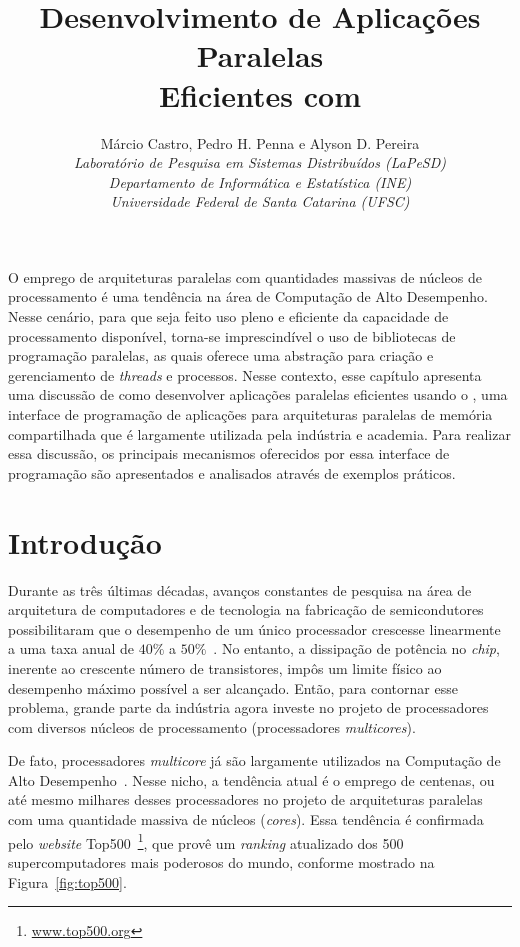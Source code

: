 \documentclass{SBCbookchapter}
\author{%
	Márcio Castro, Pedro H. Penna e Alyson D. Pereira                  \\
	\textit{Laboratório de Pesquisa em Sistemas Distribuídos (LaPeSD)} \\
	\textit{Departamento de Informática e Estatística (INE)}           \\
	\textit{Universidade Federal de Santa Catarina (UFSC)}
}
\title{Desenvolvimento de Aplicações Paralelas\\Eficientes com \openmp}
\begin{document}
\maketitle

\begin{resumo}
	O emprego de arquiteturas paralelas com quantidades massivas de
	núcleos de processamento é uma tendência na área de Computação de
	Alto Desempenho. Nesse cenário, para que seja feito uso pleno e
	eficiente da capacidade de processamento disponível, torna-se
	imprescindível o uso de bibliotecas de programação paralelas, as
	quais oferece uma abstração para criação e gerenciamento de
	\textit{threads} e processos. Nesse contexto, esse capítulo
	apresenta uma discussão de como desenvolver aplicações paralelas
	eficientes usando o \openmp, uma interface de programação de
	aplicações para arquiteturas paralelas de memória compartilhada que
	é largamente utilizada pela indústria e academia. Para realizar essa
	discussão, os principais mecanismos oferecidos por essa interface de
	programação são apresentados e analisados através de exemplos
	práticos.
\end{resumo}

\section{Introdução}

	Durante as três últimas décadas, avanços constantes de pesquisa na
	área de arquitetura de computadores e de tecnologia na fabricação de
	semicondutores possibilitaram que o desempenho de um único
	processador crescesse linearmente a uma taxa anual de $40\%$ a
	$50\%$~\cite{LARUS08}. No entanto, a dissipação de potência no
	\textit{chip}, inerente ao crescente número de transistores, impôs
	um limite físico ao desempenho máximo possível a ser alcançado.
	Então, para contornar esse problema, grande parte da indústria agora
	investe no projeto de processadores com diversos núcleos de
	processamento (processadores \textit{multicores}).

	De fato, processadores \textit{multicore} já são largamente
	utilizados na Computação de Alto Desempenho~\cite{Asanovic09}.
	Nesse nicho, a tendência atual é o emprego de centenas, ou até mesmo
	milhares desses processadores no projeto de arquiteturas paralelas
	com uma quantidade massiva de núcleos (\textit{cores}). Essa
	tendência é confirmada pelo \textit{website}
	Top500~\footnote{\url{www.top500.org}}, que provê um
	\textit{ranking} atualizado	dos 500 supercomputadores mais poderosos
	do mundo, conforme mostrado na Figura~\ref{fig:top500}.
		
\end{document}
